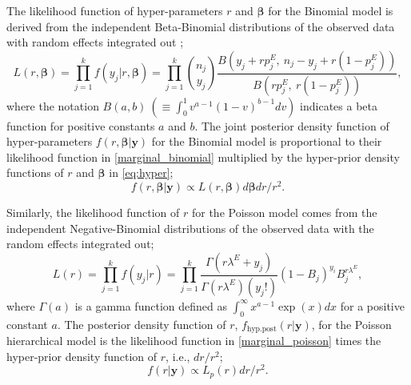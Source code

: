 \documentclass[article]{jss}
\begin{document}
The likelihood function of hyper-parameters $r$ and $\boldsymbol{\beta}$ for the Binomial  model is derived from the independent Beta-Binomial  distributions of the observed data with random effects integrated out \citep{skellam1948}; %
\begin{equation}\label{marginal_binomial}
L(r, \boldsymbol{\boldsymbol{\beta}})=\prod_{j=1}^k f(y_j\vert r, \boldsymbol{\boldsymbol{\beta}})=\prod_{j=1}^k\binom{n_j}{y_j}\frac{B(y_j+rp^E_j, ~n_j-y_j+r(1-p^E_j))}{B(rp^E_j, ~r(1-p^E_j))},
\end{equation}
where the notation $B(a, b)~(\equiv\int_0^1 v^{a-1}(1-v)^{b-1}dv)$ indicates a beta function for positive constants $a$ and $b$. The joint posterior density  function of hyper-parameters $f(r, \boldsymbol{\boldsymbol{\beta}}\vert \boldsymbol{y})$ for the Binomial  model is proportional to their likelihood function in \eqref{marginal_binomial} multiplied by the hyper-prior density functions of $r$ and $\boldsymbol{\beta}$ in  \eqref{eq:hyper};
\begin{equation}\label{marginal_post_binomial}
f(r, \boldsymbol{\boldsymbol{\beta}}\vert \boldsymbol{y})\propto L(r, \boldsymbol{\boldsymbol{\beta}})d\boldsymbol{\beta}dr/r^2.
\end{equation}


Similarly, the likelihood function of $r$ for the Poisson  model  comes from the independent Negative-Binomial  distributions of the observed data with the random effects integrated out;
\begin{equation}\label{marginal_poisson}
L(r)=\prod_{j=1}^k f(y_j\vert r)=\prod^{k}_{j=1} \frac{\Gamma(r \lambda^E+y_j)}{\Gamma(r\lambda^E)(y_j!)}(1-B_{j})^{y_{i}}B_{j}^{r \lambda^E},
\end{equation}
where $\Gamma(a)$ is a gamma function defined as $\int_0^\infty x^{a-1}\exp(x)dx$ for a positive constant $a$. The posterior density function of $r$, $f_{\textrm{hyp.post}}(r\vert \boldsymbol{y})$, for the Poisson hierarchical model is  the likelihood function in  \eqref{marginal_poisson} times the hyper-prior density function of $r$, i.e., $dr/r^2$;
\begin{equation}\label{marginal_post_poisson}
f(r \vert \boldsymbol{y})\propto L_p(r)dr/r^2.
\end{equation}


\end{document}
